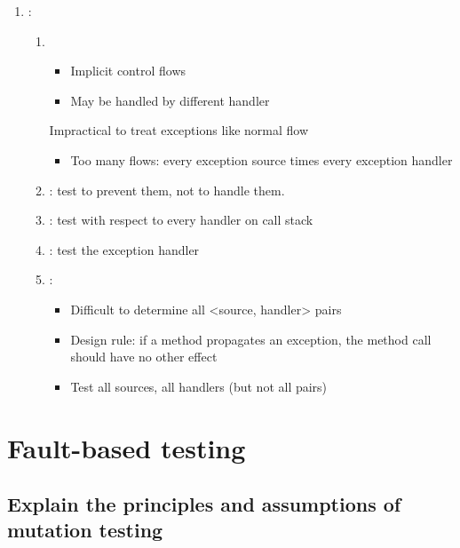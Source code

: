 \begin{enumerate}
    \item {} : 
    \begin{enumerate}
        \item {} 
        \begin{itemize}
            \item Implicit control flows
            \item May be handled by different handler
        \end{itemize}
        Impractical to treat exceptions like normal flow
        \begin{itemize}
            \item Too many flows: every exception source times every exception handler
        \end{itemize}
        \item {} : test to prevent them, not to handle them.
        \item {} : test with respect to every handler on call stack
        \item {} : test the exception handler
        \item {} :
        \begin{itemize}
            \item Difficult to determine all <source, handler> pairs
            \item Design rule: if a method propagates an exception, the method call should have no other effect
            \item Test all sources, all handlers (but not all pairs)
        \end{itemize}
    \end{enumerate}
\end{enumerate}

\chapter{Fault-based testing}

\section{Explain the principles and assumptions of mutation testing}

